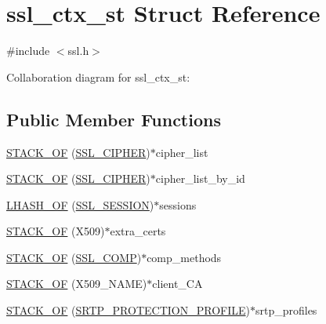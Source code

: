 \hypertarget{structssl__ctx__st}{\section{ssl\-\_\-ctx\-\_\-st Struct Reference}
\label{structssl__ctx__st}
}


{\ttfamily \#include $<$ssl.\-h$>$}



Collaboration diagram for ssl\-\_\-ctx\-\_\-st\-:
\subsection*{Public Member Functions}
\begin{DoxyCompactItemize}
\item 
\hyperlink{structssl__ctx__st_aeae48802a98db69348bba2b610fd5c0c}{S\-T\-A\-C\-K\-\_\-\-O\-F} (\hyperlink{ssl_8h_a548d7a5d565a9e0e9bd45c49f8c95701}{S\-S\-L\-\_\-\-C\-I\-P\-H\-E\-R})$\ast$cipher\-\_\-list
\item 
\hyperlink{structssl__ctx__st_aea9ca79cf751419a511ce4f171fd9064}{S\-T\-A\-C\-K\-\_\-\-O\-F} (\hyperlink{ssl_8h_a548d7a5d565a9e0e9bd45c49f8c95701}{S\-S\-L\-\_\-\-C\-I\-P\-H\-E\-R})$\ast$cipher\-\_\-list\-\_\-by\-\_\-id
\item 
\hyperlink{structssl__ctx__st_a31f304395cbaf8bdbf2eae3693f3d0f4}{L\-H\-A\-S\-H\-\_\-\-O\-F} (\hyperlink{ssl_8h_a8dd6b81bbcb1b2d769235c37779d2a94}{S\-S\-L\-\_\-\-S\-E\-S\-S\-I\-O\-N})$\ast$sessions
\item 
\hyperlink{structssl__ctx__st_aeb590bc7c9be569fa3d60563763c8fca}{S\-T\-A\-C\-K\-\_\-\-O\-F} (X509)$\ast$extra\-\_\-certs
\item 
\hyperlink{structssl__ctx__st_ade6674ea4627c2c5ad756c112d6ff389}{S\-T\-A\-C\-K\-\_\-\-O\-F} (\hyperlink{ssl_8h_a4cd5a344b1a968bf05804c52899f21fe}{S\-S\-L\-\_\-\-C\-O\-M\-P})$\ast$comp\-\_\-methods
\item 
\hyperlink{structssl__ctx__st_aa1061d7d0405217fb37a7d822716e92a}{S\-T\-A\-C\-K\-\_\-\-O\-F} (X509\-\_\-\-N\-A\-M\-E)$\ast$client\-\_\-\-C\-A
\item 
\hyperlink{structssl__ctx__st_abe263c734b3b85b909a6a0accef3a66f}{S\-T\-A\-C\-K\-\_\-\-O\-F} (\hyperlink{ssl_8h_ad71374b5a3df5292d0722b703841292e}{S\-R\-T\-P\-\_\-\-P\-R\-O\-T\-E\-C\-T\-I\-O\-N\-\_\-\-P\-R\-O\-F\-I\-L\-E})$\ast$srtp\-\_\-profiles
\end{DoxyCompactItemize}
